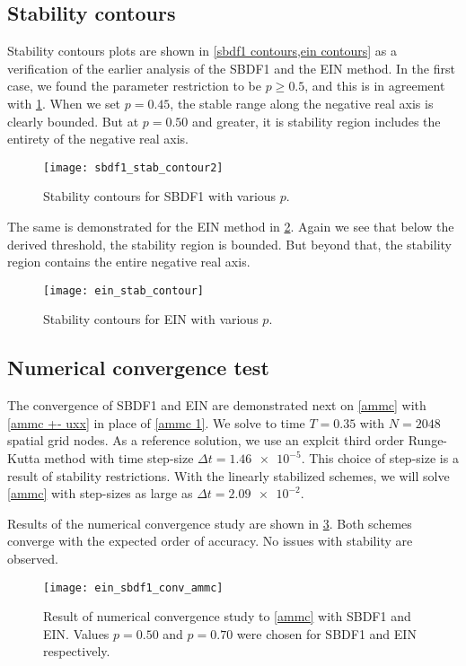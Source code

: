 \subsection{Stability contours}
Stability contours plots are shown in \cref{sbdf1 contours,ein contours} as a verification of the earlier analysis of the SBDF1 and the EIN method. In the first case, we found the parameter restriction to be $p\geq 0.5$, and this is in agreement with \cref{sbdf1 contours}. When we set $p=0.45$, the stable range along the negative real axis is clearly bounded. But at $p=0.50$ and greater, it is stability region includes the entirety of the negative real axis.
\begin{figure}[htb!]
        \centering
\texttt{[image: sbdf1\_stab\_contour2]}
\caption{Stability contours for SBDF1 with various $p$.}
\label{sbdf1 contours}
\end{figure}

The same is demonstrated for the EIN method in \cref{ein contours}. Again we see that below the derived threshold, the stability region is bounded. But beyond that, the stability region contains the entire negative real axis.
\begin{figure}[htb!]
        \centering
\texttt{[image: ein\_stab\_contour]}
\caption{Stability contours for EIN with various $p$.}
\label{ein contours}
\end{figure}

\subsection{Numerical convergence test}
\label{ein conv test}
The convergence of SBDF1 and EIN are demonstrated next on \cref{ammc} with \cref{ammc +- uxx} in place of \eqref{ammc 1}. We solve to time $T=0.35$ with $N=2048$ spatial grid nodes. As a reference solution, we use an explcit third order Runge-Kutta method with time step-size $\Delta t=\num{1.46e-5}$. This choice of step-size is a result of stability restrictions. With the linearly stabilized schemes, we will solve \cref{ammc} with step-sizes as large as $\Delta t = \num{2.09e-2}$.

Results of the numerical convergence study are shown in \cref{ein_sbdf1_conv_ammc}. Both schemes converge with the expected order of accuracy. No issues with stability are observed.
\begin{figure}[htb!]
        \centering
\texttt{[image: ein\_sbdf1\_conv\_ammc]}
\caption[Numerical convergence study with SBDF1 and EIN]{Result of numerical convergence study to \cref{ammc} with SBDF1 and EIN. Values $p=0.50$ and $p=0.70$ were chosen for SBDF1 and EIN respectively.}
\label{ein_sbdf1_conv_ammc}
\end{figure}
